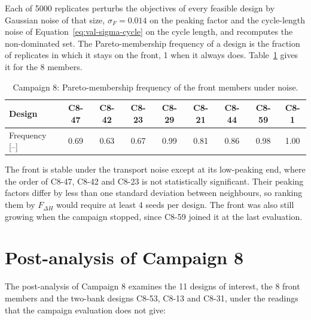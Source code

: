 Each of 5000 replicates perturbs the objectives of every feasible
design by Gaussian noise of that size, $\sigma_F = 0.014$ on the peaking
factor and the cycle-length noise of Equation~\eqref{eq:val-sigma-cycle}
on the cycle length, and recomputes the non-dominated set. The
Pareto-membership frequency of a design is the fraction of replicates
in which it stays on the front, 1 when it always does.
Table~\ref{tab:c8-val-front} gives it for the 8 members.

\begin{table}[htbp]
  \centering
  \small
  \caption{Campaign 8: Pareto-membership frequency of the front members under noise.}
  \label{tab:c8-val-front}
  \begin{tabular}{@{}lcccccccc@{}}
    \toprule
    Design & C8-47 & C8-42 & C8-23 & C8-29 & C8-21 & C8-44 & C8-59 & C8-1 \\
    \midrule
    Frequency [--] & 0.69 & 0.63 & 0.67 & 0.99 & 0.81 & 0.86 & 0.98 & 1.00 \\
    \bottomrule
  \end{tabular}
\end{table}

The front is stable under the transport noise except at its
low-peaking end, where the order of C8-47, C8-42 and C8-23 is not
statistically significant. Their peaking factors differ by less than
one standard deviation between neighbours, so ranking them by
$F_{\Delta H}$ would require at least 4 seeds per design. The front was
also still growing when the campaign stopped, since C8-59 joined it at
the last evaluation.

\section{Post-analysis of Campaign 8}
\label{sec:res-c8-post}

The post-analysis of Campaign 8 examines the 11 designs
of interest, the 8 front members and the two-bank designs C8-53,
C8-13 and C8-31, under the readings that the campaign evaluation does not give:

